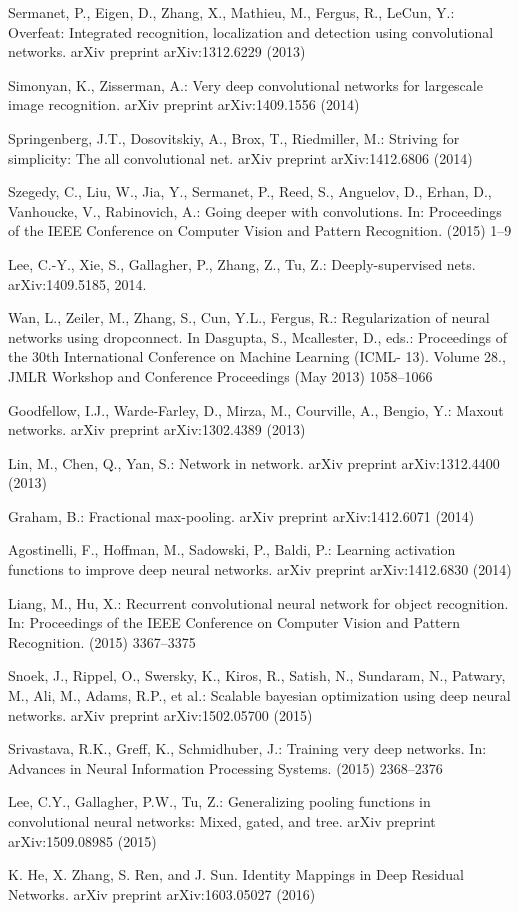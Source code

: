 \documentclass[10pt,twocolumn,letterpaper]{article}
\begin{document}
{\begin{thebibliography}{9}
\bibitem{[14]}
Sermanet, P., Eigen, D., Zhang, X., Mathieu, M., Fergus, R., LeCun, Y.:
Overfeat: Integrated recognition, localization and detection using convolutional
networks. arXiv preprint arXiv:1312.6229 (2013)

\bibitem{[15]}
Simonyan, K., Zisserman, A.: Very deep convolutional networks for largescale
image recognition. arXiv preprint arXiv:1409.1556 (2014)

\bibitem{[16]}
Springenberg, J.T., Dosovitskiy, A., Brox, T., Riedmiller, M.: Striving for
simplicity: The all convolutional net. arXiv preprint arXiv:1412.6806 (2014)

\bibitem{[17]}
Szegedy, C., Liu, W., Jia, Y., Sermanet, P., Reed, S., Anguelov, D., Erhan,
D., Vanhoucke, V., Rabinovich, A.: Going deeper with convolutions.
In: Proceedings of the IEEE Conference on Computer Vision and Pattern
Recognition. (2015) 1–9

\bibitem{[18]}
Lee, C.-Y., Xie, S., Gallagher, P., Zhang, Z., Tu, Z.: Deeply-supervised
nets. arXiv:1409.5185, 2014.

\bibitem{[19]}
Wan, L., Zeiler, M., Zhang, S., Cun, Y.L., Fergus, R.: Regularization of neural
networks using dropconnect. In Dasgupta, S., Mcallester, D., eds.: Proceedings
of the 30th International Conference on Machine Learning (ICML-
13). Volume 28., JMLR Workshop and Conference Proceedings (May 2013)
1058–1066

\bibitem{[20]}
Goodfellow, I.J., Warde-Farley, D., Mirza, M., Courville, A., Bengio, Y.:
Maxout networks. arXiv preprint arXiv:1302.4389 (2013)

\bibitem{[21]}
Lin, M., Chen, Q., Yan, S.: Network in network. arXiv preprint
arXiv:1312.4400 (2013)

\bibitem{[22]}
Graham, B.: Fractional max-pooling. arXiv preprint arXiv:1412.6071 (2014)

\bibitem{[23]}
Agostinelli, F., Hoffman, M., Sadowski, P., Baldi, P.: Learning activation
functions to improve deep neural networks. arXiv preprint arXiv:1412.6830
(2014)

\bibitem{[24]}
Liang, M., Hu, X.: Recurrent convolutional neural network for object recognition.
In: Proceedings of the IEEE Conference on Computer Vision and
Pattern Recognition. (2015) 3367–3375

\bibitem{[25]}
Snoek, J., Rippel, O., Swersky, K., Kiros, R., Satish, N., Sundaram, N.,
Patwary, M., Ali, M., Adams, R.P., et al.: Scalable bayesian optimization
using deep neural networks. arXiv preprint arXiv:1502.05700 (2015)

\bibitem{[26]}
Srivastava, R.K., Greff, K., Schmidhuber, J.: Training very deep networks.
In: Advances in Neural Information Processing Systems. (2015) 2368–2376

\bibitem{[27]}
Lee, C.Y., Gallagher, P.W., Tu, Z.: Generalizing pooling functions in
convolutional neural networks: Mixed, gated, and tree. arXiv preprint
arXiv:1509.08985 (2015)

\bibitem{[32]}
K. He, X. Zhang, S. Ren, and J. Sun. Identity Mappings in Deep Residual Networks.  arXiv preprint arXiv:1603.05027 (2016)


\end{thebibliography}
}
\end{document}

